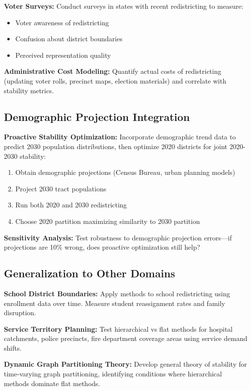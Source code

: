 \textbf{Voter Surveys:} Conduct surveys in states with recent redistricting to measure:
\begin{itemize}
    \item Voter awareness of redistricting
    \item Confusion about district boundaries
    \item Perceived representation quality
\end{itemize}

\textbf{Administrative Cost Modeling:} Quantify actual costs of redistricting (updating voter rolls, precinct maps, election materials) and correlate with stability metrics.

\subsection{Demographic Projection Integration}

\textbf{Proactive Stability Optimization:} Incorporate demographic trend data to predict 2030 population distributions, then optimize 2020 districts for joint 2020-2030 stability:
\begin{enumerate}
    \item Obtain demographic projections (Census Bureau, urban planning models)
    \item Project 2030 tract populations
    \item Run both 2020 and 2030 redistricting
    \item Choose 2020 partition maximizing similarity to 2030 partition
\end{enumerate}

\textbf{Sensitivity Analysis:} Test robustness to demographic projection errors—if projections are 10\% wrong, does proactive optimization still help?

\subsection{Generalization to Other Domains}

\textbf{School District Boundaries:} Apply methods to school redistricting using enrollment data over time. Measure student reassignment rates and family disruption.

\textbf{Service Territory Planning:} Test hierarchical vs flat methods for hospital catchments, police precincts, fire department coverage areas using service demand shifts.

\textbf{Dynamic Graph Partitioning Theory:} Develop general theory of stability for time-varying graph partitioning, identifying conditions where hierarchical methods dominate flat methods.

